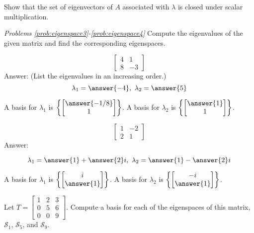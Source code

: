 \documentclass{ximera}
\begin{document}
\begin{problem}\label{prob:eigenspace2}
Show that the set of eigenvectors of $A$ associated with $\lambda$ is closed under scalar multiplication.
\end{problem}
    
    
\emph{Problems \ref{prob:eigenspace3}-\ref{prob:eigenspace4}}
Compute the eigenvalues of the given matrix and find the corresponding eigenspaces.
    
\begin{problem}\label{prob:eigenspace3}
$$\begin{bmatrix}4&1\\8&-3\end{bmatrix}$$
Answer:
(List the eigenvalues in an increasing order.)
$$\lambda_1=\answer{-4},\quad\lambda_2=\answer{5}$$
    
A basis for $\lambda_1$ is $\left\{\begin{bmatrix}\answer{-1/8}\\1\end{bmatrix}\right\}$.  A basis for $\lambda_2$ is $\left\{\begin{bmatrix}\answer{1}\\1\end{bmatrix}\right\}$.
\end{problem}
    
\begin{problem}\label{prob:eigenspace4}
$$\begin{bmatrix}1&-2\\2&1\end{bmatrix}$$
Answer:
    
$$\lambda_1=\answer{1}+\answer{2}i,\quad\lambda_2=\answer{1}-\answer{2}i$$
    
A basis for $\lambda_1$ is $\left\{\begin{bmatrix}i\\\answer{1}\end{bmatrix}\right\}$.  A basis for $\lambda_2$ is $\left\{\begin{bmatrix}-i\\\answer{1}\end{bmatrix}\right\}$.
\end{problem}
    
    
\begin{problem}\label{prob:3x3tri_ev}
Let $T=\begin{bmatrix} 1 & 2 & 3\\ 0 & 5 & 6\\ 0 & 0 & 9\end{bmatrix}$.  Compute a basis for each of the eigenspaces of this matrix, $\mathcal{S}_1$, $\mathcal{S}_5$, and $\mathcal{S}_9$.
\end{problem}
    
\end{document}

